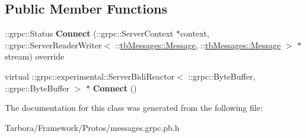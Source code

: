 \subsection*{Public Member Functions}
\begin{DoxyCompactItemize}
\item 
\mbox{\label{classtbMessages_1_1TarboraMessages_1_1ExperimentalWithRawCallbackMethod__Connect_ae03e894dd39651f082655c93c6abcd13}} 
\+::grpc\+::\+Status {\bfseries Connect} (\+::grpc\+::\+Server\+Context $\ast$context, \+::grpc\+::\+Server\+Reader\+Writer$<$ \+::\hyperlink{classtbMessages_1_1Message}{tb\+Messages\+::\+Message}, \+::\hyperlink{classtbMessages_1_1Message}{tb\+Messages\+::\+Message} $>$ $\ast$stream) override
\item 
\mbox{\label{classtbMessages_1_1TarboraMessages_1_1ExperimentalWithRawCallbackMethod__Connect_a60596e519a519e9c9904434b22a9e0c5}} 
virtual \+::grpc\+::experimental\+::\+Server\+Bidi\+Reactor$<$ \+::grpc\+::\+Byte\+Buffer, \+::grpc\+::\+Byte\+Buffer $>$ $\ast$ {\bfseries Connect} ()
\end{DoxyCompactItemize}


The documentation for this class was generated from the following file\+:\begin{DoxyCompactItemize}
\item 
Tarbora/\+Framework/\+Protos/messages.\+grpc.\+pb.\+h\end{DoxyCompactItemize}
